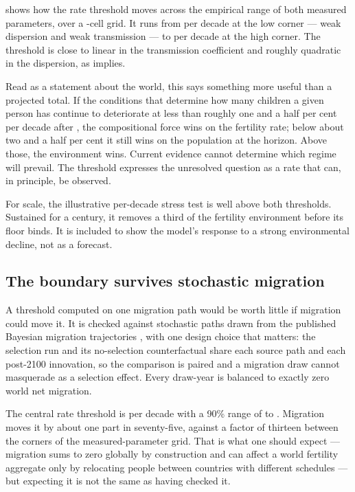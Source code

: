  shows how the rate threshold moves across the empirical range
of both measured parameters, over a \BoundaryGridCells{}-cell grid. It runs from
\BoundaryFloor{} per decade at the low corner --- weak dispersion and weak
transmission --- to \BoundaryCeiling{} per decade at the high corner. The
threshold is close to linear in the transmission coefficient and roughly
quadratic in the dispersion, as  implies.

Read as a statement about the world, this says something more useful than a
projected total. If the conditions that determine how many children a given
person has continue to deteriorate at less than roughly one and a half per cent
per decade after \PressureFromYear{}, the compositional force wins on the
fertility rate; below about two and a half per cent it still wins on the
population at the horizon. Above those, the environment wins. Current evidence
cannot determine which regime will prevail. The threshold expresses the
unresolved question as a rate that can, in principle, be observed.

For scale, the illustrative \PressureStressTest{} per-decade stress test is well
above both thresholds. Sustained for a century, it removes a third of the
fertility environment before its floor binds. It is included to show the model's
response to a strong environmental decline, not as a forecast.

\subsection{The boundary survives stochastic migration}
\label{sec:migration-robustness}

A threshold computed on one migration path would be worth little if migration
could move it. It is checked against \PairedMigrationPaths{} stochastic paths
drawn from the published Bayesian migration trajectories \citep{azose2015}, with
one design choice that matters: the selection run and its no-selection
counterfactual share each source path and each post-2100 innovation, so the
comparison is paired and a migration draw cannot masquerade as a selection
effect. Every draw-year is balanced to exactly zero world net migration.

The central rate threshold is \BoundaryPaired{} per decade with a 90\% range of
\BoundaryPairedLow{} to \BoundaryPairedHigh{}. Migration moves it by about one
part in seventy-five, against a factor of thirteen between the corners of the
measured-parameter grid. That is what one should expect --- migration sums to
zero globally by construction and can affect a world fertility aggregate only by
relocating people between countries with different schedules --- but expecting it
is not the same as having checked it.
